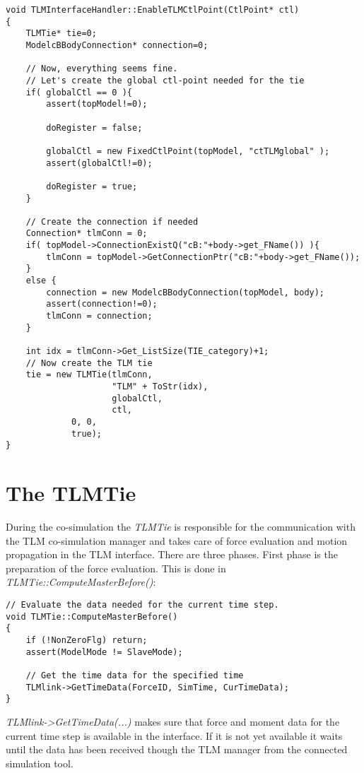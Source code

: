 {\scriptsize
\begin{verbatim}
void TLMInterfaceHandler::EnableTLMCtlPoint(CtlPoint* ctl)
{
    TLMTie* tie=0;
    ModelcBBodyConnection* connection=0;

    // Now, everything seems fine.
    // Let's create the global ctl-point needed for the tie
    if( globalCtl == 0 ){
        assert(topModel!=0);

        doRegister = false;

        globalCtl = new FixedCtlPoint(topModel, "ctTLMglobal" );
        assert(globalCtl!=0);

        doRegister = true;
    }

    // Create the connection if needed
    Connection* tlmConn = 0;
    if( topModel->ConnectionExistQ("cB:"+body->get_FName()) ){
        tlmConn = topModel->GetConnectionPtr("cB:"+body->get_FName());
    }
    else {
        connection = new ModelcBBodyConnection(topModel, body);
        assert(connection!=0);
        tlmConn = connection;
    }

    int idx = tlmConn->Get_ListSize(TIE_category)+1;
    // Now create the TLM tie
    tie = new TLMTie(tlmConn,
                     "TLM" + ToStr(idx),
                     globalCtl,
                     ctl,
		     0, 0,
		     true);
}
\end{verbatim}
}

\section{The TLMTie}

During the co-simulation the {\em TLMTie} is responsible for the communication with the TLM co-simulation manager and takes care of force evaluation and motion propagation in the TLM interface. 
There are three phases. 
First phase is the preparation of the force evaluation. 
This is done in {\em TLMTie::ComputeMasterBefore()}:

{\scriptsize
\begin{verbatim}
// Evaluate the data needed for the current time step.
void TLMTie::ComputeMasterBefore()
{
    if (!NonZeroFlg) return;
    assert(ModelMode != SlaveMode);

    // Get the time data for the specified time
    TLMlink->GetTimeData(ForceID, SimTime, CurTimeData);
}
\end{verbatim}
}

{\em TLMlink->GetTimeData(...)} makes sure that force and moment data for the current time step is available in the interface. 
If it is not yet available it waits until the data has been received though the TLM manager from the connected simulation tool.


